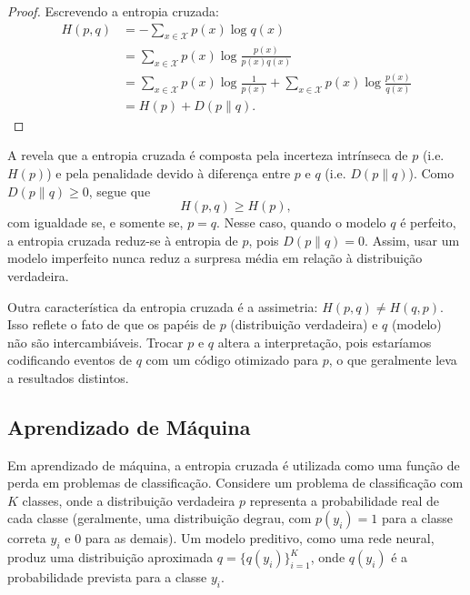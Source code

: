 \begin{proof}
Escrevendo a entropia cruzada:
\begin{subequations}\label{eq:crossentropykldiv}
\begin{align}
H(p, q) &= - \sum_{x \in \mathcal{X}} p(x) \log q(x) \\
        &= \sum_{x \in \mathcal{X}} p(x) \log \frac{p(x)}{p(x)q(x)} \\
        &= \sum_{x \in \mathcal{X}} p(x) \log \frac{1}{p(x)} + \sum_{x \in \mathcal{X}} p(x) \log \frac{p(x)}{q(x)} \\
        &= H(p) + D(p\|q) .
\end{align}
\end{subequations}
\end{proof}

A  revela que a entropia cruzada é composta pela incerteza intrínseca de $p$ (i.e. $H(p)$)
e pela penalidade devido à diferença entre $p$ e $q$ (i.e. $D(p\|q)$). Como $D(p\|q) \geq 0$, segue que
\begin{equation}
H(p, q) \geq H(p),
\end{equation}
com igualdade se, e somente se, $p = q$. Nesse caso, quando o modelo $q$ é perfeito, 
a entropia cruzada reduz-se à entropia de $p$, pois $D(p\|q) = 0$. 
Assim, usar um modelo imperfeito nunca reduz a surpresa média em relação à distribuição verdadeira.

Outra característica da entropia cruzada é a assimetria: $H(p, q) \neq H(q, p)$. 
Isso reflete o fato de que os papéis de $p$ (distribuição verdadeira) e $q$ (modelo) não são intercambiáveis. 
Trocar $p$ e $q$ altera a interpretação, pois estaríamos codificando eventos de $q$ com um código 
otimizado para $p$, o que geralmente leva a resultados distintos.





\subsection{Aprendizado de Máquina}

Em aprendizado de máquina, a entropia cruzada é utilizada como uma
função de perda em problemas de classificação. Considere um problema de
classificação com $K$ classes, onde a distribuição verdadeira $p$ representa a
probabilidade real de cada classe (geralmente, uma distribuição degrau, com
$p(y_i) = 1$ para a classe correta $y_i$ e $0$ para as demais). Um modelo
preditivo, como uma rede neural, produz uma distribuição aproximada 
$q = \{q(y_i) \}_{i=1}^K$, onde $q(y_i)$ é a probabilidade prevista para a classe
$y_i$.

